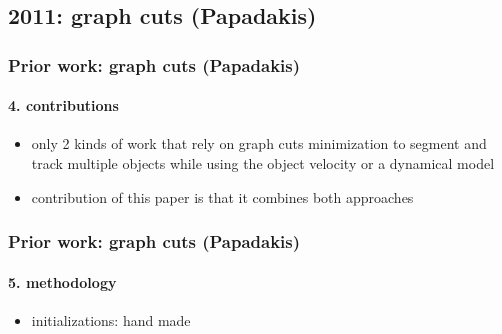 \subsection{2011: graph cuts (Papadakis)}
\begin{frame}
\frametitle{Prior work: graph cuts (Papadakis)}
\framesubtitle{4. contributions}
\mypagenum
{}
	\begin{itemize}
		\item only 2 kinds of work that rely on graph cuts minimization to segment and track multiple objects while using the object velocity or a dynamical model 
		\item contribution of this paper is that it combines both approaches
	\end{itemize}
\end{frame}


\begin{frame}
\frametitle{Prior work: graph cuts (Papadakis)}
\framesubtitle{5. methodology}
\mypagenum
{}
	\begin{itemize}
		\item {\color{red}initializations:} hand made
	\end{itemize}
\end{frame}

\printbibliography


